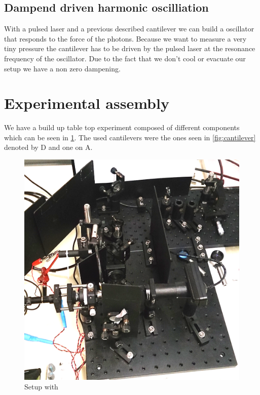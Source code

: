 \documentclass[12pt,a4paper]{article}
\begin{document}
\subsection{Dampend driven harmonic oscilliation}
With a pulsed laser and a previous described cantilever we can build a oscillator that responds to the force of the photons. Because we want to measure a very tiny pressure the cantilever has to be driven by the pulsed laser at the resonance frequency of the oscillator. Due to the fact that we don't cool or evacuate our setup we have a non zero dampening.\\


\section{Experimental assembly}
We have a build up table top experiment composed of different components which can be seen in \ref{fig:setup}. The used cantilevers were the ones seen in \ref{fig:cantilever} denoted by D and one on A.\\
\begin{figure}[H]
	\centering
	\includegraphics[scale=0.4]{../figures/aufbau.png}
	\caption{Setup with}
	\label{fig:setup}
\end{figure}
\end{document}

